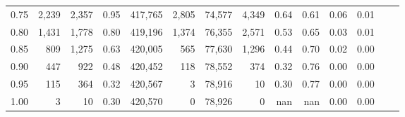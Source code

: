 \begin{tabular}{rrrrrrrrrrrrrr}
0.75 &   2,239 &  2,357 &    0.95 &  417,765 &    2,805 &  74,577 &   4,349 &  0.64 &  0.61 &  0.06 &      0.01 \\
0.80 &   1,431 &  1,778 &    0.80 &  419,196 &    1,374 &  76,355 &   2,571 &  0.53 &  0.65 &  0.03 &      0.01 \\
0.85 &     809 &  1,275 &    0.63 &  420,005 &      565 &  77,630 &   1,296 &  0.44 &  0.70 &  0.02 &      0.00 \\
0.90 &     447 &    922 &    0.48 &  420,452 &      118 &  78,552 &     374 &  0.32 &  0.76 &  0.00 &      0.00 \\
0.95 &     115 &    364 &    0.32 &  420,567 &        3 &  78,916 &      10 &  0.30 &  0.77 &  0.00 &      0.00 \\
1.00 &       3 &     10 &    0.30 &  420,570 &        0 &  78,926 &       0 &   nan &   nan &  0.00 &      0.00 \\
\bottomrule
\end{tabular}
